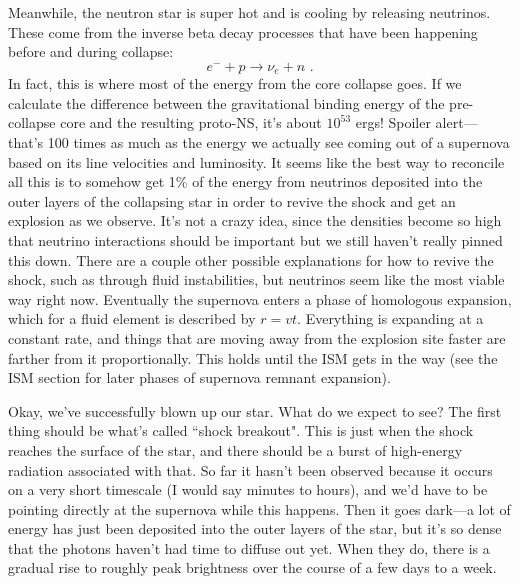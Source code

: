 Meanwhile, the neutron star is super hot and is cooling by releasing neutrinos. These come from the inverse beta decay processes that have been happening before and during collapse:
\begin{equation}
e^- + p \rightarrow \nu_e + n\,\,.
\end{equation}
In fact, this is where most of the energy from the core collapse goes. If we calculate the difference between the gravitational binding energy of the pre-collapse core and the resulting proto-NS, it's about $10^{53}$ ergs! Spoiler alert---that's 100 times as much as the energy we actually see coming out of a supernova based on its line velocities and luminosity. It seems like the best way to reconcile all this is to somehow get 1\% of the energy from neutrinos deposited into the outer layers of the collapsing star in order to revive the shock and get an explosion as we observe. It's not a crazy idea, since the densities become so high that neutrino interactions should be important but we still haven't really pinned this down. There are a couple other possible explanations for how to revive the shock, such as through fluid instabilities, but neutrinos seem like the most viable way right now. Eventually the supernova enters a phase of homologous expansion, which for a fluid element is described by $r = v t$. Everything is expanding at a constant rate, and things that are moving away from the explosion site faster are farther from it proportionally. This holds until the ISM gets in the way (see the ISM section for later phases of supernova remnant expansion).

Okay, we've successfully blown up our star. What do we expect to see? The first thing should be what's called ``shock breakout". This is just when the shock reaches the surface of the star, and there should be a burst of high-energy radiation associated with that. So far it hasn't been observed because it occurs on a very short timescale (I would say minutes to hours), and we'd have to be pointing directly at the supernova while this happens. Then it goes dark---a lot of energy has just been deposited into the outer layers of the star, but it's so dense that the photons haven't had time to diffuse out yet. When they do, there is a gradual rise to roughly peak brightness over the course of a few days to a week.

